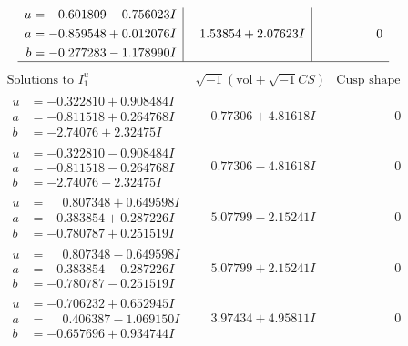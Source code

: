 \documentclass[1p]{elsarticle_modified}
\theoremstyle{definition}
\newcommand{\I}{\sqrt{-1}}
\begin{document}
$$\begin{array}{c|c|c}
\begin{aligned}
u &= -0.601809 - 0.756023 I \\
a &= -0.859548 + 0.012076 I \\
b &= -0.277283 - 1.178990 I\end{aligned}
 & \phantom{-}1.53854 + 2.07623 I & \phantom{-0.000000 } 0\\
 \hline 
 \end{array}$$\newpage$$\begin{array}{c|c|c}  
\text{Solutions to }I^u_{1}& \I (\text{vol} + \sqrt{-1}CS) & \text{Cusp shape}\\
 \hline 
\begin{aligned}
u &= -0.322810 + 0.908484 I \\
a &= -0.811518 + 0.264768 I \\
b &= -2.74076 + 2.32475 I\end{aligned}
 & \phantom{-}0.77306 + 4.81618 I & \phantom{-0.000000 } 0 \\ \hline\begin{aligned}
u &= -0.322810 - 0.908484 I \\
a &= -0.811518 - 0.264768 I \\
b &= -2.74076 - 2.32475 I\end{aligned}
 & \phantom{-}0.77306 - 4.81618 I & \phantom{-0.000000 } 0 \\ \hline\begin{aligned}
u &= \phantom{-}0.807348 + 0.649598 I \\
a &= -0.383854 + 0.287226 I \\
b &= -0.780787 + 0.251519 I\end{aligned}
 & \phantom{-}5.07799 - 2.15241 I & \phantom{-0.000000 } 0 \\ \hline\begin{aligned}
u &= \phantom{-}0.807348 - 0.649598 I \\
a &= -0.383854 - 0.287226 I \\
b &= -0.780787 - 0.251519 I\end{aligned}
 & \phantom{-}5.07799 + 2.15241 I & \phantom{-0.000000 } 0 \\ \hline\begin{aligned}
u &= -0.706232 + 0.652945 I \\
a &= \phantom{-}0.406387 - 1.069150 I \\
b &= -0.657696 + 0.934744 I\end{aligned}
 & \phantom{-}3.97434 + 4.95811 I & \phantom{-0.000000 } 0 \\ \hline\begin{aligned}

\end{aligned}
\end{array}$$
\end{document}
